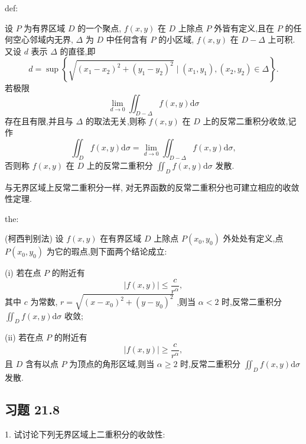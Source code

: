 \begin{definition}{}{def:}

\end{definition}
设 \(P\) 为有界区域 \(D\) 的一个聚点, \(f\left( {x,y}\right)\) 在 \(D\) 上除点 \(P\) 外皆有定义,且在 \(P\) 的任何空心邻域内无界, \(\Delta\) 为 \(D\) 中任何含有 \(P\) 的小区域, \(f\left( {x,y}\right)\) 在 \(D - \Delta\) 上可积. 又设 \(d\) 表示 \(\Delta\) 的直径,即
\[
d = \sup \left\{  {\sqrt{{\left( {x}_{1} - {x}_{2}\right) }^{2} + {\left( {y}_{1} - {y}_{2}\right) }^{2}} \mid  \left( {{x}_{1},{y}_{1}}\right) ,\left( {{x}_{2},{y}_{2}}\right)  \in  \Delta }\right\}  .
\]
若极限
\[
\mathop{\lim }\limits_{{d \rightarrow  0}}{\iint }_{D - \Delta }f\left( {x,y}\right) \mathrm{d}\sigma
\]
存在且有限,并且与 \(\Delta\) 的取法无关,则称 \(f\left( {x,y}\right)\) 在 \(D\) 上的反常二重积分收敛,记作
\[
{\iint }_{D}f\left( {x,y}\right) \mathrm{d}\sigma  = \mathop{\lim }\limits_{{d \rightarrow  0}}{\iint }_{D - \Delta }f\left( {x,y}\right) \mathrm{d}\sigma ,
\]
否则称 \(f\left( {x,y}\right)\) 在 \(D\) 上的反常二重积分 \({\iint }_{D}f\left( {x,y}\right) \mathrm{d}\sigma\) 发散.

与无界区域上反常二重积分一样, 对无界函数的反常二重积分也可建立相应的收敛性定理.

\begin{theorem}{}{the:}

\end{theorem}
 (柯西判别法) 设 \(f\left( {x,y}\right)\) 在有界区域 \(D\) 上除点 \(P\left( {{x}_{0},{y}_{0}}\right)\) 外处处有定义,点 \(P\left( {{x}_{0},{y}_{0}}\right)\) 为它的瑕点,则下面两个结论成立:

(i) 若在点 \(P\) 的附近有
\[
\left| {f\left( {x,y}\right) }\right|  \leq  \frac{c}{{r}^{\alpha }},
\]
其中 \(c\) 为常数, \(r = \sqrt{{\left( x - {x}_{0}\right) }^{2} + {\left( y - {y}_{0}\right) }^{2}}\) ,则当 \(\alpha  < 2\) 时,反常二重积分 \({\iint }_{D}f\left( {x,y}\right) \mathrm{d}\sigma\) 收敛;

(ii) 若在点 \(P\) 的附近有
\[
\left| {f\left( {x,y}\right) }\right|  \geq  \frac{c}{{r}^{\alpha }},
\]
且 \(D\) 含有以点 \(P\) 为顶点的角形区域,则当 \(\alpha  \geq  2\) 时,反常二重积分 \({\iint }_{D}f\left( {x,y}\right) \mathrm{d}\sigma\) 发散.

\subsection{习题 21.8}

1. 试讨论下列无界区域上二重积分的收敛性:

